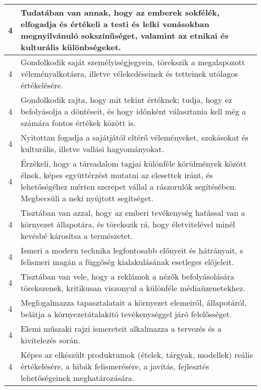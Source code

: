 \begin{longtable}{c | p{12cm} }
                                
                                          4 &  Tudatában van annak, hogy az emberek sokfélék, elfogadja és értékeli a testi és lelki vonásokban megnyilvánuló sokszínűséget, valamint az etnikai és kulturális különbségeket. \\ \hline
                                          4 &  Gondolkodik saját személyiségjegyein, törekszik a megalapozott véleményalkotásra, illetve vélekedéseinek és tetteinek utólagos értékelésére. \\ \hline
                                          4 &  Gondolkodik rajta, hogy mit tekint értéknek; tudja, hogy ez befolyásolja a döntéseit, és hogy időnként választania kell még a számára fontos értékek között is. \\ \hline
                                          4 &  Nyitottan fogadja a sajátjától eltérő véleményeket, szokásokat és kulturális, illetve vallási hagyományokat. \\ \hline
                                          4 &  Érzékeli, hogy a társadalom tagjai különféle körülmények között élnek, képes együttérzést mutatni az elesettek iránt, és lehetőségéhez mérten szerepet vállal a rászorulók segítésében. Megbecsüli a neki nyújtott segítséget. \\ \hline
                                          4 &  Tisztában van azzal, hogy az emberi tevékenység hatással van a környezet állapotára, és törekszik rá, hogy életvitelével minél kevésbé károsítsa a természetet. \\ \hline
                                          4 &  Ismeri a modern technika legfontosabb előnyeit és hátrányait, s felismeri magán a függőség kialakulásának esetleges előjeleit. \\ \hline
                                          4 &  Tisztában van vele, hogy a reklámok a nézők befolyásolására törekszenek, kritikusan viszonyul a különféle médiaüzenetekhez. \\ \hline
                                          4 &  Megfogalmazza tapasztalatait a környezet elemeiről, állapotáról, belátja a környezetátalakító tevékenységgel járó felelősséget. \\ \hline
                                          4 &  Elemi műszaki rajzi ismereteit alkalmazza a tervezés és a kivitelezés során. \\ \hline
                                          4 &  Képes az elkészült produktumok (ételek, tárgyak, modellek) reális értékelésére, a hibák felismerésére, a javítás, fejlesztés lehetőségeinek meghatározására. \\ \hline

\end{longtable}
